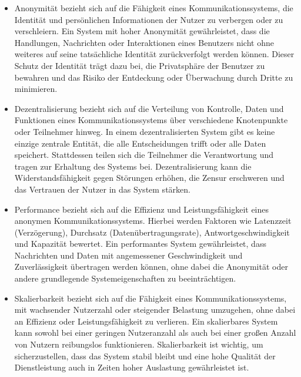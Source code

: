 \begin{itemize}

\item Anonymität bezieht sich auf die Fähigkeit eines Kommunikationssystems, die Identität und persönlichen Informationen der Nutzer zu verbergen oder zu verschleiern. Ein System mit hoher Anonymität gewährleistet, dass die Handlungen, Nachrichten oder Interaktionen eines Benutzers nicht ohne weiteres auf seine tatsächliche Identität zurückverfolgt werden können. Dieser Schutz der Identität trägt dazu bei, die Privatsphäre der Benutzer zu bewahren und das Risiko der Entdeckung oder Überwachung durch Dritte zu minimieren.

\item Dezentralisierung bezieht sich auf die Verteilung von Kontrolle, Daten und Funktionen eines Kommunikationssystems über verschiedene Knotenpunkte oder Teilnehmer hinweg. In einem dezentralisierten System gibt es keine einzige zentrale Entität, die alle Entscheidungen trifft oder alle Daten speichert. Stattdessen teilen sich die Teilnehmer die Verantwortung und tragen zur Erhaltung des Systems bei. Dezentralisierung kann die Widerstandsfähigkeit gegen Störungen erhöhen, die Zensur erschweren und das Vertrauen der Nutzer in das System stärken.

\item Performance bezieht sich auf die Effizienz und Leistungsfähigkeit eines anonymen Kommunikationssystems. Hierbei werden Faktoren wie Latenzzeit (Verzögerung), Durchsatz (Datenübertragungsrate), Antwortgeschwindigkeit und Kapazität bewertet. Ein performantes System gewährleistet, dass Nachrichten und Daten mit angemessener Geschwindigkeit und Zuverlässigkeit übertragen werden können, ohne dabei die Anonymität oder andere grundlegende Systemeigenschaften zu beeinträchtigen.

\item Skalierbarkeit bezieht sich auf die Fähigkeit eines Kommunikationssystems, mit wachsender Nutzerzahl oder steigender Belastung umzugehen, ohne dabei an Effizienz oder Leistungsfähigkeit zu verlieren. Ein skalierbares System kann sowohl bei einer geringen Nutzeranzahl als auch bei einer großen Anzahl von Nutzern reibungslos funktionieren. Skalierbarkeit ist wichtig, um sicherzustellen, dass das System stabil bleibt und eine hohe Qualität der Dienstleistung auch in Zeiten hoher Auslastung gewährleistet ist.

\end{itemize}